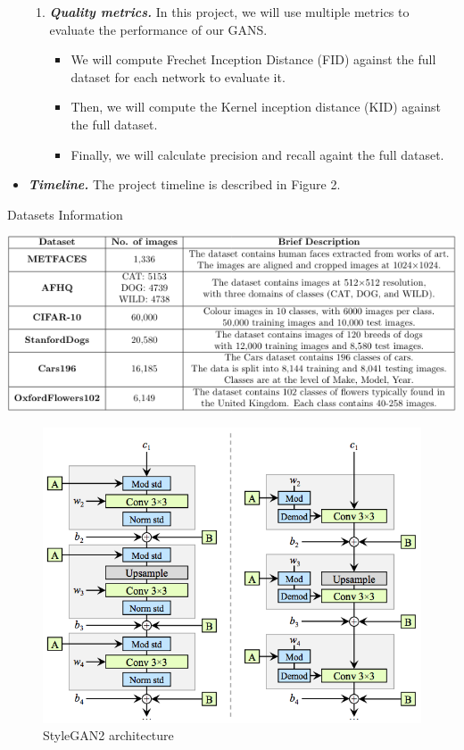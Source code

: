 \documentclass{report}
\begin{document}
\begin{itemize}
\begin{enumerate}
        \item \textbf{\textit{Quality metrics.}} In this project, we will use multiple metrics to evaluate the performance of our GANS.
        \begin{itemize}
            \item We will compute Frechet Inception Distance (FID) against the full dataset for each network to evaluate it.
            \item Then, we will compute the Kernel inception distance (KID) against the full dataset.
            \item Finally, we will calculate precision and recall againt the full dataset.
        \end{itemize}
        
    \end{enumerate}
    
    \item \textbf{\textit{Timeline.}} The project timeline is described in Figure 2.

\end{itemize}


\begin{table}[h]

        \centering 
        \caption{Datasets Information}
        \includegraphics[width=\textwidth]{figs/table_1.png}
\end{table}


\begin{figure}[h]
    \centering 
    \caption{StyleGAN2 architecture}
    \includegraphics[width=\textwidth]{figs/stylegan2_arch.png}
\end{figure}
\end{document}
